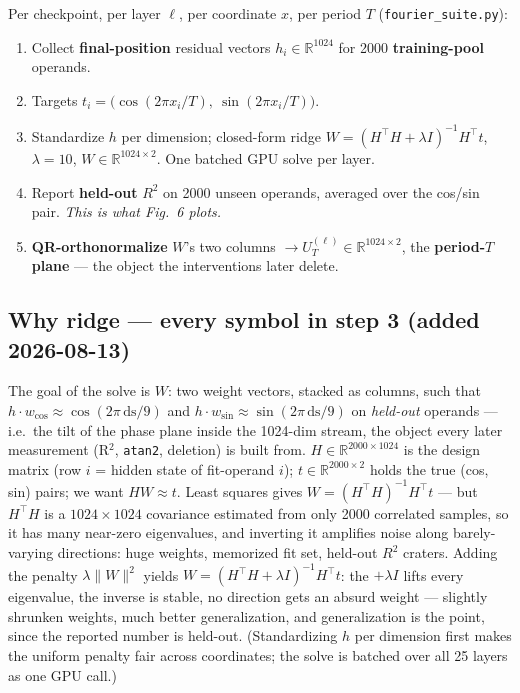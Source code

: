 \documentclass[11pt]{article}
\newcommand{\ds}{\mathrm{ds}}
\begin{document}
Per checkpoint, per layer $\ell$, per coordinate $x$, per period $T$
(\texttt{fourier\_suite.py}):

\begin{enumerate}[leftmargin=*,itemsep=2pt]
\item Collect \textbf{final-position} residual vectors $h_i \in \mathbb{R}^{1024}$
for 2000 \textbf{training-pool} operands.
\item Targets $t_i = \big(\cos(2\pi x_i/T),\ \sin(2\pi x_i/T)\big)$.
\item Standardize $h$ per dimension; closed-form ridge
$W = (H^\top H + \lambda I)^{-1} H^\top t$, $\lambda = 10$, $W \in
\mathbb{R}^{1024\times 2}$. One batched GPU solve per layer.
\item Report \textbf{held-out} $R^2$ on 2000 unseen operands, averaged over the
cos/sin pair. \emph{This is what Fig.~6 plots.}
\item \textbf{QR-orthonormalize} $W$'s two columns $\to U_T^{(\ell)} \in
\mathbb{R}^{1024\times 2}$, the \textbf{period-$T$ plane} --- the object the
interventions later delete.
\end{enumerate}

\subsection*{Why ridge --- every symbol in step 3 (added 2026-08-13)}

The goal of the solve is $W$: two weight vectors, stacked as columns, such that
$h \cdot w_{\cos} \approx \cos(2\pi\,\ds/9)$ and
$h \cdot w_{\sin} \approx \sin(2\pi\,\ds/9)$ on \emph{held-out} operands ---
i.e.\ the tilt of the phase plane inside the 1024-dim stream, the object every
later measurement (R$^2$, \texttt{atan2}, deletion) is built from.
$H \in \mathbb{R}^{2000 \times 1024}$ is the design matrix (row $i$ = hidden
state of fit-operand $i$); $t \in \mathbb{R}^{2000 \times 2}$ holds the true
(cos, sin) pairs; we want $HW \approx t$. Least squares gives
$W = (H^\top H)^{-1} H^\top t$ --- but $H^\top H$ is a $1024 \times 1024$
covariance estimated from only 2000 correlated samples, so it has many
near-zero eigenvalues, and inverting it amplifies noise along barely-varying
directions: huge weights, memorized fit set, held-out $R^2$ craters. Adding the
penalty $\lambda \lVert W \rVert^2$ yields
$W = (H^\top H + \lambda I)^{-1} H^\top t$: the $+\lambda I$ lifts every
eigenvalue, the inverse is stable, no direction gets an absurd weight ---
slightly shrunken weights, much better generalization, and generalization is the
point, since the reported number is held-out. (Standardizing $h$ per dimension
first makes the uniform penalty fair across coordinates; the solve is batched
over all 25 layers as one GPU call.)
\end{document}
